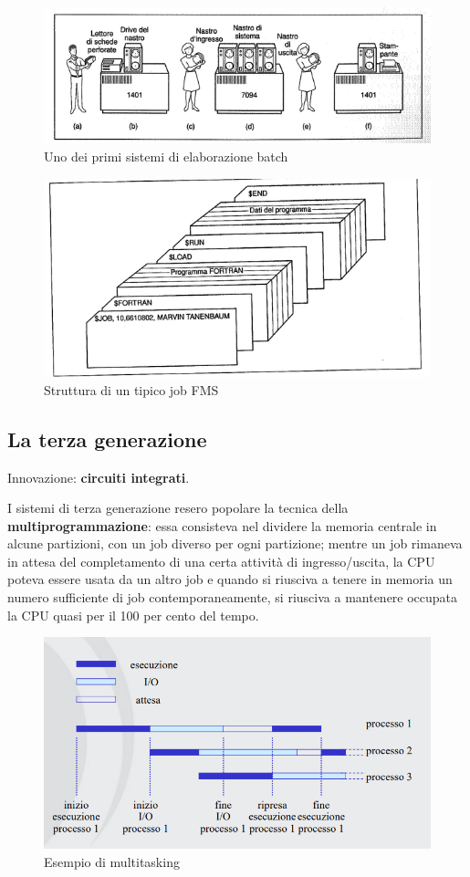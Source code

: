 \begin{figure}[h!]
    \centering
    \includegraphics[width=0.7\linewidth]{assets/batch1.png}
    \caption{Uno dei primi sistemi di elaborazione batch}
\end{figure}

\begin{figure}[h!]
    \centering
    \includegraphics[width=0.7\linewidth]{assets/job1.png}
    \caption{Struttura di un tipico job FMS}
\end{figure}

\subsection{La terza generazione}
Innovazione: \textbf{circuiti integrati}.

I sistemi di terza generazione resero popolare la tecnica della \textbf{multiprogrammazione}: essa consisteva nel dividere la memoria centrale in alcune partizioni, con un job diverso per ogni partizione; mentre un job rimaneva in attesa del completamento di una certa attività di ingresso/uscita, la CPU poteva essere usata da un altro job e quando si riusciva a tenere in memoria un numero sufficiente di job contemporaneamente, si riusciva a mantenere occupata la CPU quasi per il 100 per cento del tempo.

\begin{figure}[h!]
    \centering
    \includegraphics[width=0.7\linewidth]{assets/multiprogrammazione1.png}
    \caption{Esempio di multitasking}
\end{figure}

